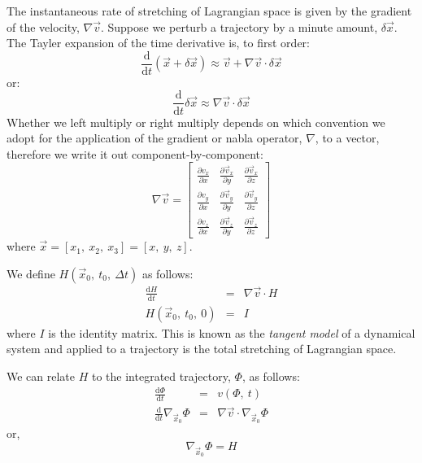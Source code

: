 \documentclass[12pt]{article}
\begin{document}
The instantaneous rate of stretching of Lagrangian space is given by the
gradient of the velocity, $\nabla \vec v$.
Suppose we perturb a trajectory by a minute amount, $\delta \vec x$.
The Tayler expansion of the time derivative is, to first order:
\begin{equation}
\frac{\mathrm d}{\mathrm d t} (\vec x + \delta \vec x) \approx
	\vec v + \nabla \vec v \cdot \delta \vec x
\end{equation}
or:
\begin{equation}
\frac{\mathrm d}{\mathrm d t}\delta \vec x \approx \nabla \vec v \cdot \delta \vec x
\label{evolution_error_vector}
\end{equation}
Whether we left multiply or right multiply depends on which convention we adopt
for the application of the gradient or nabla operator, $\nabla$, to a vector,
therefore we write it out component-by-component:
\begin{equation}
\nabla \vec v = \left [
\begin{array}{ccc}
\frac{\partial v_x}{\partial x} & \frac{\partial \vec v_x}{\partial y} & \frac{\partial \vec v_x}{\partial z} \\
\frac{\partial v_y}{\partial x} & \frac{\partial \vec v_y}{\partial y} & \frac{\partial \vec v_y}{\partial z} \\
\frac{\partial v_z}{\partial x} & \frac{\partial \vec v_z}{\partial y} & \frac{\partial \vec v_z}{\partial z}
\end{array} \right ]
\end{equation}
where $\vec x=[x_1,~x_2,~x_3]=[x,~y,~z]$.

We define $H(\vec x_0,~t_0,~\Delta t)$ as follows:
\begin{eqnarray}
\frac{\mathrm d H}{\mathrm d t} & = & \nabla \vec v \cdot H \\
\label{deformation_matrix}
H(\vec x_0,~t_0,~0) & = & I
\end{eqnarray}
where $I$ is the identity matrix.
This is known as the {\it tangent model} of a dynamical system and applied
to a trajectory is the total stretching of Lagrangian space.

We can relate $H$ to the integrated trajectory, $\Phi$, as follows:
\begin{eqnarray}
\frac{\mathrm d \Phi}{\mathrm d t} & = & v(\Phi, ~t) \\
\frac{\mathrm d}{\mathrm d t} 
\nabla_{\vec x_0} \Phi & = & \nabla \vec v \cdot \nabla_{\vec x_0} \Phi
\end{eqnarray}
or,
\begin{equation}
\nabla_{\vec x_0} \Phi = H
\label{advection_eqn}
\end{equation}
\end{document}
